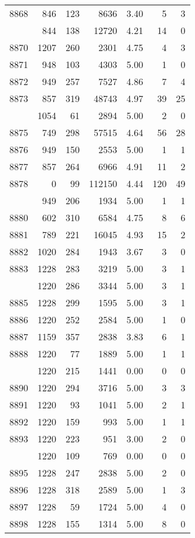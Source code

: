 \documentclass[
]{article}
\begin{document}
\begin{table}
\begin{tabular}[t]{lrrrrrr}
8868 & 846 & 123 & 8636 & 3.40 & 5 & 3\\
\addlinespace
8869 & 844 & 138 & 12720 & 4.21 & 14 & 0\\
8870 & 1207 & 260 & 2301 & 4.75 & 4 & 3\\
8871 & 948 & 103 & 4303 & 5.00 & 1 & 0\\
8872 & 949 & 257 & 7527 & 4.86 & 7 & 4\\
8873 & 857 & 319 & 48743 & 4.97 & 39 & 25\\
\addlinespace
8874 & 1054 & 61 & 2894 & 5.00 & 2 & 0\\
8875 & 749 & 298 & 57515 & 4.64 & 56 & 28\\
8876 & 949 & 150 & 2553 & 5.00 & 1 & 1\\
8877 & 857 & 264 & 6966 & 4.91 & 11 & 2\\
8878 & 0 & 99 & 112150 & 4.44 & 120 & 49\\
\addlinespace
8879 & 949 & 206 & 1934 & 5.00 & 1 & 1\\
8880 & 602 & 310 & 6584 & 4.75 & 8 & 6\\
8881 & 789 & 221 & 16045 & 4.93 & 15 & 2\\
8882 & 1020 & 284 & 1943 & 3.67 & 3 & 0\\
8883 & 1228 & 283 & 3219 & 5.00 & 3 & 1\\
\addlinespace
8884 & 1220 & 286 & 3344 & 5.00 & 3 & 1\\
8885 & 1228 & 299 & 1595 & 5.00 & 3 & 1\\
8886 & 1220 & 252 & 2584 & 5.00 & 1 & 0\\
8887 & 1159 & 357 & 2838 & 3.83 & 6 & 1\\
8888 & 1220 & 77 & 1889 & 5.00 & 1 & 1\\
\addlinespace
8889 & 1220 & 215 & 1441 & 0.00 & 0 & 0\\
8890 & 1220 & 294 & 3716 & 5.00 & 3 & 3\\
8891 & 1220 & 93 & 1041 & 5.00 & 2 & 1\\
8892 & 1220 & 159 & 993 & 5.00 & 1 & 1\\
8893 & 1220 & 223 & 951 & 3.00 & 2 & 0\\
\addlinespace
8894 & 1220 & 109 & 769 & 0.00 & 0 & 0\\
8895 & 1228 & 247 & 2838 & 5.00 & 2 & 0\\
8896 & 1228 & 318 & 2589 & 5.00 & 1 & 3\\
8897 & 1228 & 59 & 1724 & 5.00 & 4 & 0\\
8898 & 1228 & 155 & 1314 & 5.00 & 8 & 0\\

\end{tabular}
\end{table}
\end{document}
